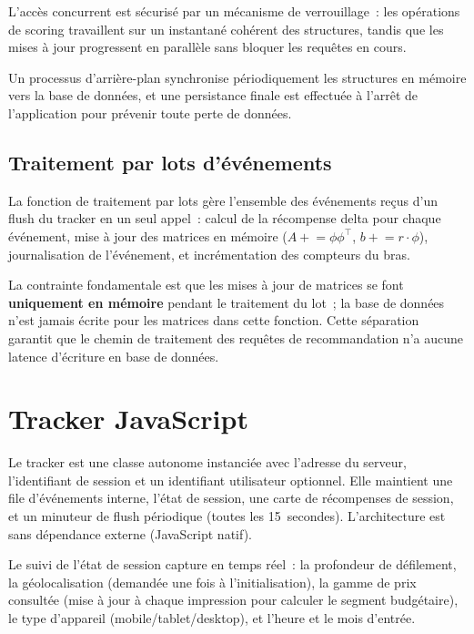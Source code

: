 L'accès concurrent est sécurisé par un mécanisme de verrouillage~: 
les opérations de scoring travaillent sur un instantané cohérent 
des structures, tandis que les mises à jour progressent en parallèle 
sans bloquer les requêtes en cours.

Un processus d'arrière-plan synchronise périodiquement les structures 
en mémoire vers la base de données, et une persistance finale est 
effectuée à l'arrêt de l'application pour prévenir toute perte de 
données.

\subsection{Traitement par lots d'événements}

La fonction de traitement par lots gère l'ensemble des événements reçus d'un flush du tracker
en un seul appel~: calcul de la récompense delta pour chaque événement, mise à jour des
matrices en mémoire ($A \mathrel{+}= \phi\phi^\top$, $b \mathrel{+}= r \cdot \phi$),
journalisation de l'événement, et incrémentation des compteurs du bras.

La contrainte fondamentale est que les mises à jour de matrices se font \textbf{uniquement
en mémoire} pendant le traitement du lot~; la base de données n'est jamais écrite
pour les matrices dans cette fonction. Cette séparation garantit que le chemin de traitement
des requêtes de recommandation n'a aucune latence d'écriture en base de données.


\section{Tracker JavaScript}


Le tracker est une classe autonome instanciée avec l'adresse du serveur, l'identifiant de
session et un identifiant utilisateur optionnel. Elle maintient une file d'événements interne,
l'état de session, une carte de récompenses de session, et un minuteur de flush périodique
(toutes les 15~secondes). L'architecture est sans dépendance externe (JavaScript natif).

Le suivi de l'état de session capture en temps réel~: la profondeur de défilement, la
géolocalisation (demandée une fois à l'initialisation), la gamme de prix consultée (mise
à jour à chaque impression pour calculer le segment budgétaire), le type d'appareil
(mobile/tablet/desktop), et l'heure et le mois d'entrée.

